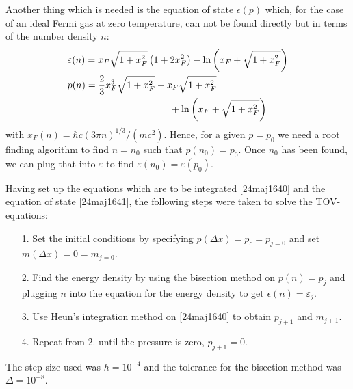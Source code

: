 \documentclass[twocolumn]{article}
\begin{document}
\begin{large}
Another thing which is needed is the equation of state $\epsilon(p)$ which, for the case of an ideal Fermi gas at zero temperature, can not be found directly but in terms of the number density $n$:
\begin{equation}
    \label{24maj1641}
    \begin{split}
        &\varepsilon(n) = x_F\sqrt{1+x_F^2}\left(1+2x_F^2\right)-\ln\left(x_F+\sqrt{1+x_F^2}\right) \\ 
        &p(n) = \frac{2}{3}x_F^3\sqrt{1+x_F^2}-x_F\sqrt{1+x_F^2} \\ 
        &\hspace{3.75cm}+\ln\left(x_F+\sqrt{1+x_F^2}\right)
    \end{split}
\end{equation}
with $x_F(n)=\hbar c(3\pi n)^{1/3}/(mc^2)$. Hence, for a given $p=p_0$ we need a root finding algorithm to find $n=n_0$ such that $p(n_0) = p_0$. Once $n_0$ has been found, we can plug that into $\varepsilon$ to find $\varepsilon(n_0)=\varepsilon(p_0)$. 

Having set up the equations which are to be integrated \eqref{24maj1640} and the equation of state \eqref{24maj1641}, the following steps were taken to solve the TOV-equations: 
\begin{itemize}
    \item[1.] Set the initial conditions by specifying $p(\Delta x) = p_c = p_{j=0}$ and set $m(\Delta x) = 0 = m_{j=0}$.
    \item[2.] Find the energy density by using the bisection method on $p(n) = p_j$ and plugging $n$ into the equation for the energy density to get $\epsilon(n)=\varepsilon_j$. 
    \item[3.] Use Heun's integration method on \eqref{24maj1640} to obtain $p_{j+1}$ and $m_{j+1}$. 
    \item[4.] Repeat from 2. until the pressure is zero, $p_{j+1}=0$.
\end{itemize}
The step size used was $h=10^{-4}$ and the tolerance for the bisection method was $\Delta = 10^{-8}$. 


\end{large}
\end{document}
